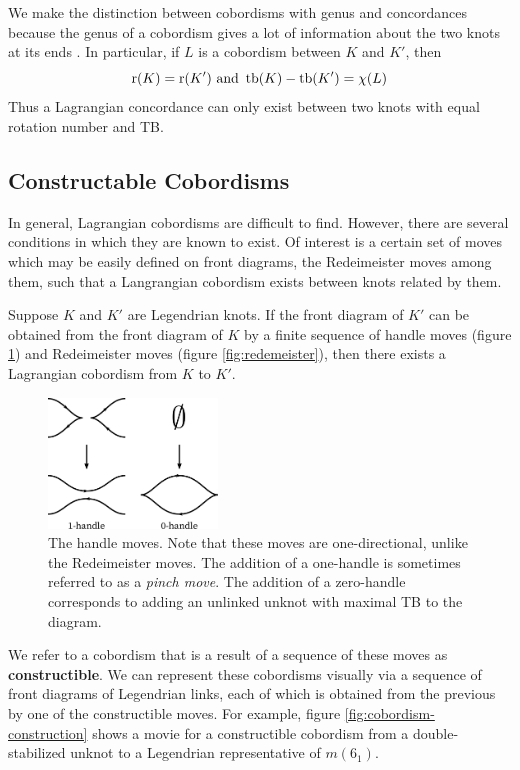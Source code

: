 We make the distinction between cobordisms with genus and concordances because the genus of a cobordism gives a lot of information about the two knots at its ends \cite{chantraine2010}. In particular, if $L$ is a cobordism between $K$ and $K'$, then
\[
    \operatorname{r}(K) = \operatorname{r}(K') \text{     and     } \operatorname{tb}(K) - \operatorname{tb}(K') = \chi(L)
\]
Thus a Lagrangian concordance can only exist between two knots with equal rotation number and TB.


\subsection{Constructable Cobordisms}

In general, Lagrangian cobordisms are difficult to find. However, there are several conditions in which they are known to exist. Of interest is a certain set of moves which may be easily defined on front diagrams, the Redeimeister moves among them, such that a Langrangian cobordism exists between knots related by them.

\begin{theorem}
    Suppose $K$ and $K'$ are Legendrian knots. If the front diagram of $K'$ can be obtained from the front diagram of $K$ by a finite sequence of handle moves (figure \ref{fig:handles}) and Redeimeister moves (figure \ref{fig:redemeister}), then there exists a Lagrangian cobordism from $K$ to $K'$. 
\end{theorem}
\begin{figure}[ht!]
    \centering
    \includegraphics[width=0.4\textwidth]{images/handles.pdf}
    \caption{The handle moves. Note that these moves are one-directional, unlike the Redeimeister moves. The addition of a one-handle is sometimes referred to as a \emph{pinch move}. The addition of a zero-handle corresponds to adding an unlinked unknot with maximal TB to the diagram.}
    \label{fig:handles}
\end{figure}

We refer to a cobordism that is a result of a sequence of these moves as \textbf{constructible}. We can represent these cobordisms visually via a sequence of front diagrams of Legendrian links, each of which is obtained from the previous by one of the constructible moves. For example, figure \ref{fig:cobordism-construction} shows a movie for a constructible cobordism from a double-stabilized unknot to a Legendrian representative of $m(6_1)$.

